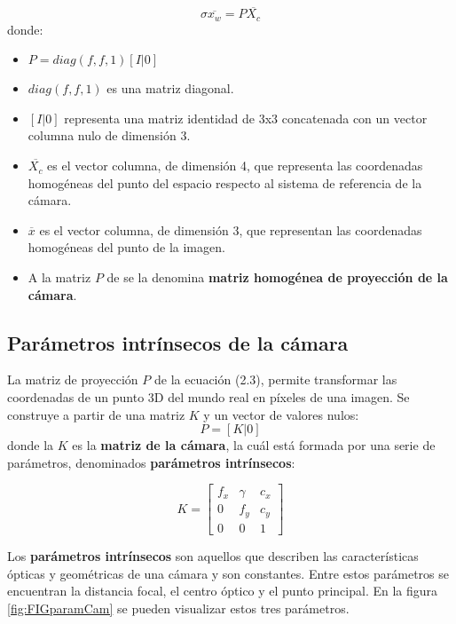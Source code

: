 \begin{equation}\label{eq:proy}
\sigma \overline{x_w} = P \overline{X_c}   
\end{equation}
donde:
\begin{itemize}
\item $P = diag(f, f, 1) [I|0]$
\item $diag(f, f, 1)$ es una matriz diagonal.
\item $[I|0]$ representa una matriz identidad de 3x3 concatenada con un vector columna nulo de dimensión 3.
\item $\overline{X_c}$  es el vector columna, de dimensión 4, que representa las coordenadas homogéneas del punto del espacio respecto al sistema de referencia de la cámara.
\item $\overline{x}$  es el vector columna, de dimensión 3, que representan las coordenadas homogéneas del punto de la imagen.
\item A la matriz $P$ de se la denomina \textbf{matriz homogénea de proyección de la cámara}.
\end{itemize}


\subsection{Parámetros intrínsecos de la cámara}
La matriz de proyección $P$ de la ecuación (2.3), permite transformar las coordenadas de un punto 3D del mundo real en píxeles de una imagen. Se construye a partir de una matriz $K$ y un vector de valores nulos:
\begin{equation}
 P = [K|0] 
\end{equation}
donde la $K$ es la \textbf{matriz de la cámara}, la cuál está formada por una serie de parámetros, denominados \textbf{parámetros intrínsecos}:

\begin{equation}
  K =
  \begin{bmatrix}
    f_{x} & \gamma & {c_{x}} \\
    {0}&{f_{y}}&{c_{y}}\\
    {0}&{0}&{1}
  \end{bmatrix}
\end{equation}

Los \textbf{parámetros intrínsecos} son aquellos que describen las características ópticas y geométricas de una cámara y son constantes. Entre estos parámetros se encuentran la distancia focal, el centro óptico y el punto principal. En la figura \ref{fig:FIGparamCam} se pueden visualizar estos tres parámetros.


